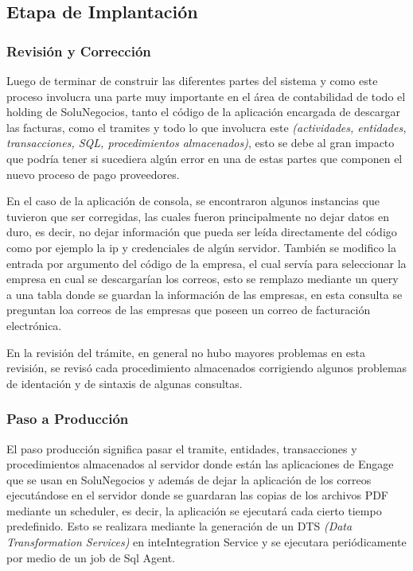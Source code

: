 \subsection{Etapa de Implantación}

	\subsubsection{Revisión y Corrección}
	Luego de terminar de construir las diferentes partes del sistema y como este proceso involucra una parte muy importante en el área de contabilidad de todo el holding de SoluNegocios, tanto el código de la aplicación encargada de descargar las facturas, como el tramites y todo lo que involucra este \textit{(actividades, entidades, transacciones, SQL, procedimientos almacenados)}, esto se debe al gran impacto que podría tener si sucediera algún error en una de estas partes que componen el nuevo proceso de pago proveedores.
	\newline
	\par
	En el caso de la aplicación de consola, se encontraron algunos instancias que tuvieron que ser corregidas, las cuales fueron principalmente no dejar datos en duro, es decir, no dejar información que pueda ser leída directamente del código como por ejemplo la ip y credenciales de algún servidor. También se modifico la entrada por argumento del código de la empresa, el cual servía para seleccionar la empresa en cual se descargarían los correos, esto se remplazo mediante un query a una tabla donde se guardan la información de las empresas, en esta consulta se preguntan loa correos de las empresas que poseen un correo de facturación electrónica.
	\newline
	\par
	En la revisión del trámite, en general no hubo mayores problemas en esta revisión, se revisó cada procedimiento almacenados corrigiendo algunos problemas de identación y de sintaxis de algunas consultas.

	\subsubsection{Paso a Producción}
	El paso producción significa pasar el tramite, entidades, transacciones y procedimientos almacenados al servidor donde están las aplicaciones  de Engage que se usan en SoluNegocios y además de dejar la aplicación de los correos ejecutándose en el servidor donde se guardaran las copias de los archivos PDF mediante un scheduler, es decir, la aplicación se ejecutará cada cierto tiempo predefinido. Esto se realizara mediante la generación de un DTS \textit{(Data Transformation Services)} en inteIntegration Service y se ejecutara periódicamente por medio de un job de Sql Agent.